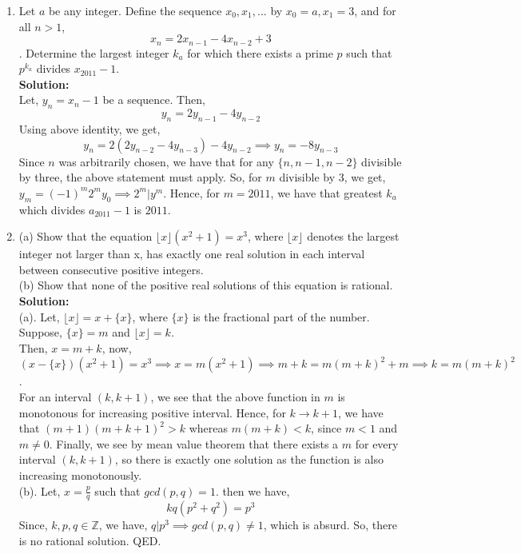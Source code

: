 \documentclass{article}
\begin{document}
\begin{enumerate}
\newpage
    
  \item  Let $a$ be any integer. Define the sequence $x_0,x_1,...$ by 
  $x_0 = a, x_1 = 3$, and for all $n > 1$,
    $$x_n = 2x_{n-1} -4x_{n-2} + 3$$.
    Determine the largest integer $k_a$ for which there exists a prime $p$ such that $p^{k_a}$ divides $x_{2011} -1$.\\
    \textbf{Solution:}\\
    Let, $y_n=x_n-1$ be a sequence. Then,
    $$y_n=2y_{n-1}-4y_{n-2}$$
    Using above identity, we get,
    $$y_n=2(2y_{n-2}-4y_{n-3})-4y_{n-2} \implies y_n=-8y_{n-3}$$
    Since $n$ was arbitrarily chosen, we have that for any $\{n,n-1,n-2\}$ divisible by three, the above statement must apply. So, for $m$ divisible by 3, we get,\\
     $y_m = (-1)^m 2^m y_0 \implies 2^m | y^m$. Hence, for $m=2011$, we have that greatest $k_a$ which divides $a_{2011}-1$ is $\boxed{2011}$.
    
    
    \newpage
    
    \item  (a) Show that the equation $\lfloor x \rfloor (x^2 + 1) = x^3$, where $\lfloor x \rfloor$ denotes the largest integer not larger than x, has exactly one real solution in each interval between consecutive positive integers. \\
    (b) Show that none of the positive real solutions of this equation is rational. \\
    \textbf{Solution:}\\
   (a). Let, $\lfloor x \rfloor =x +\{x\}$, where $\{x\}$ is the fractional part of the number. Suppose, $\{x\}=m$ and $\lfloor x \rfloor =k$.\\
    Then, $x=m+k$, now, $(x-\{x\})(x^2+1)=x^3 \implies x=m(x^2+1) \implies m+k =m(m+k)^2+m\implies k=m(m+k)^2$. \\
    For an interval $(k,k+1)$, we see that the above function in $m$ is monotonous for increasing positive interval. Hence, for $k \to k+1$, we have that $(m+1)(m+k+1)^2>k$ whereas $m(m+k)<k$, since $m<1$ and $m \not =0$. Finally, we see by mean value theorem that there exists a $m$ for every interval $(k,k+1)$, so there is exactly one solution as the function is also increasing monotonously.\\
    
    (b). Let, $x=\frac{p}{q}$ such that $gcd(p,q)=1$. then we have,
    $$kq(p^2+q^2)=p^3$$
    Since, $k,p,q \in \mathbb{Z}$, we have,
    $q|p^3 \implies gcd(p,q)\not = 1$, which is absurd. So, there is no rational solution. QED.
    

\end{enumerate}
\end{document}
